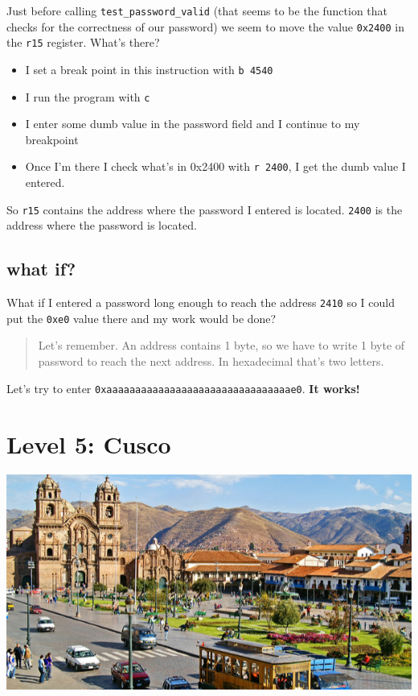 \documentclass[a4paper,11pt]{article}
\begin{document}
Just before calling \texttt{test\_password\_valid} (that seems to be the
function that checks for the correctness of our password) we seem to
move the value \texttt{0x2400} in the \texttt{r15} register. What's
there?

\begin{itemize}
\itemsep1pt\parskip0pt
\item
  I set a break point in this instruction with \texttt{b 4540}
\item
  I run the program with \texttt{c}
\item
  I enter some dumb value in the password field and I continue to my
  breakpoint
\item
  Once I'm there I check what's in 0x2400 with \texttt{r 2400}, I get
  the dumb value I entered.
\end{itemize}

So \texttt{r15} contains the address where the password I entered is
located. \texttt{2400} is the address where the password is located.

\subsection{what if?}\label{what-if}

What if I entered a password long enough to reach the address
\texttt{2410} so I could put the \texttt{0xe0} value there and my work
would be done?

\begin{quote}
Let's remember. An address contains 1 byte, so we have to write 1 byte
of password to reach the next address. In hexadecimal that's two
letters.
\end{quote}

Let's try to enter \texttt{0xaaaaaaaaaaaaaaaaaaaaaaaaaaaaaaaae0}.
\textbf{It works!}

\section{Level 5: Cusco}\label{level-5-cusco}

\includegraphics{img/5_1.PNG}
\end{document}
